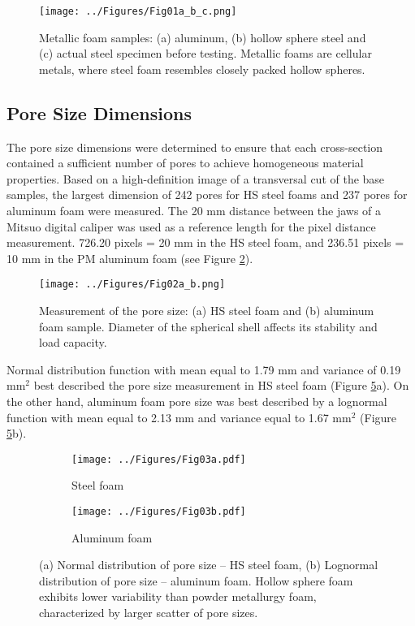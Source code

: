 \documentclass[review]{elsarticle}
\begin{document}
\begin{figure}[htbp]
	\begin{center}
		\texttt{[image: ../Figures/Fig01a\_b\_c.png]}
		\caption{Metallic foam samples: (a) aluminum, (b) hollow sphere steel and (c) actual steel specimen before testing. Metallic foams are cellular metals, where steel foam resembles closely packed hollow spheres.}
		\label{Samples}
	\end{center}
\end{figure}

\subsection*{Pore Size Dimensions}

The pore size dimensions were determined to ensure that each cross-section contained a sufficient number of pores to achieve homogeneous material properties. Based on a high-definition image of a transversal cut of the base samples, the largest dimension of 242 pores for HS steel foams and 237 pores for aluminum foam were measured. The 20 mm distance between the jaws of a Mitsuo digital caliper was used as a reference length for the pixel distance measurement. 726.20 pixels = 20 mm in the HS steel foam, and 236.51 pixels = 10 mm in the PM aluminum foam (see Figure \ref{PoreMeas}).

\begin{figure}[htbp]
	\begin{center}
		\texttt{[image: ../Figures/Fig02a\_b.png]}
		\caption{Measurement of the pore size: (a) HS steel foam and (b) aluminum foam sample. Diameter of the spherical shell affects its stability and load capacity.}
		\label{PoreMeas}
	\end{center}
\end{figure}

Normal distribution function with mean equal to 1.79 mm and variance of 0.19 mm$^2$ best described the pore size measurement in HS steel foam (Figure \ref{PoreSizeHistograms}a). On the other hand, aluminum foam pore size was best described by a lognormal function with mean equal to 2.13 mm and variance equal to 1.67 mm$^2$ (Figure \ref{PoreSizeHistograms}b).

\begin{figure}
	\centering
	\begin{subfigure}{.5\textwidth}
		\centering
		\texttt{[image: ../Figures/Fig03a.pdf]}
		\caption{Steel foam}
		\label{fig3:sub1}
	\end{subfigure}%
	\begin{subfigure}{.5\textwidth}
		\centering
		\texttt{[image: ../Figures/Fig03b.pdf]}
		\caption{Aluminum foam}
		\label{fig3:sub2}
	\end{subfigure}
	\caption{(a) Normal distribution of pore size – HS steel foam, (b) Lognormal distribution of pore size – aluminum foam. Hollow sphere foam exhibits lower variability than powder metallurgy foam, characterized by larger scatter of pore sizes.}
	\label{PoreSizeHistograms}
\end{figure}
\end{document}
